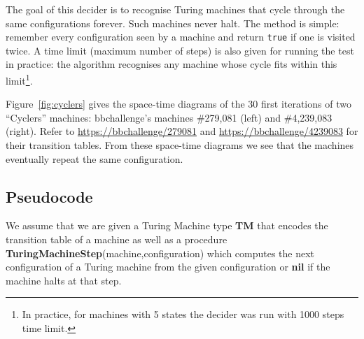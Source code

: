 The goal of this decider is to recognise Turing machines that cycle through the same configurations forever. Such machines never halt. The method is simple: remember every configuration seen by a machine and return \texttt{true} if one is visited twice. A time limit (maximum number of steps) is also given for running the test in practice: the algorithm recognises any machine whose cycle fits within this limit\footnote{In practice, for machines with 5 states the decider was run with 1000 steps time limit.}.


\begin{example}\normalfont
        Figure~\ref{fig:cyclers} gives the space-time diagrams of the 30 first iterations of two ``Cyclers'' machines: bbchallenge's machines \#279,081 (left) and \#4,239,083 (right). Refer to \url{https://bbchallenge/279081} and
        \url{https://bbchallenge/4239083} for their transition tables. From these space-time diagrams we see that the machines eventually repeat the same configuration.
\end{example}

\newpage
\subsection{Pseudocode}

We assume that we are given a Turing Machine type \textbf{TM} that encodes the transition table of a machine as well as a procedure \textbf{TuringMachineStep}(machine,configuration) which computes the next configuration of a Turing machine from the given configuration or \textbf{nil} if the machine halts at that step.

